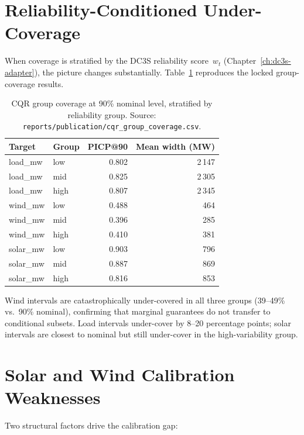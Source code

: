 \section{Reliability-Conditioned Under-Coverage}

When coverage is stratified by the DC3S reliability score~$w_t$
(Chapter~\ref{ch:dc3s-adapter}), the picture changes substantially.
Table~\ref{tab:cqr-group-coverage} reproduces the locked group-coverage
results.

\begin{table}[ht]
\centering
\caption{CQR group coverage at 90\% nominal level, stratified by
reliability group.  Source:
\texttt{reports/publication/cqr\_group\_coverage.csv}.}
\label{tab:cqr-group-coverage}
\begin{tabular}{llrr}
\toprule
\textbf{Target} & \textbf{Group} & \textbf{PICP@90} &
  \textbf{Mean width (MW)} \\
\midrule
load\_mw  & low  & 0.802 & 2\,147 \\
load\_mw  & mid  & 0.825 & 2\,305 \\
load\_mw  & high & 0.807 & 2\,345 \\
\midrule
wind\_mw  & low  & 0.488 & 464 \\
wind\_mw  & mid  & 0.396 & 285 \\
wind\_mw  & high & 0.410 & 381 \\
\midrule
solar\_mw & low  & 0.903 & 796 \\
solar\_mw & mid  & 0.887 & 869 \\
solar\_mw & high & 0.816 & 853 \\
\bottomrule
\end{tabular}
\end{table}

Wind intervals are catastrophically under-covered in all three groups
(39--49\% vs.\ 90\% nominal), confirming that marginal guarantees do not
transfer to conditional subsets.  Load intervals under-cover by 8--20
percentage points; solar intervals are closest to nominal but still
under-cover in the high-variability group.

\section{Solar and Wind Calibration Weaknesses}
\label{sec:calibration-weaknesses}

Two structural factors drive the calibration gap:

